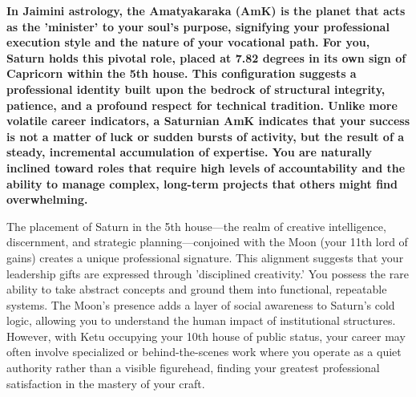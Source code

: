 
\label{topic24}

{\fontsize{9.5}{13.8}\selectfont\bfseries\color{DeepSlate} In Jaimini astrology, the Amatyakaraka (AmK) is the planet that acts as the 'minister' to your soul's purpose, signifying your professional execution style and the nature of your vocational path. For you, Saturn holds this pivotal role, placed at 7.82 degrees in its own sign of Capricorn within the 5th house. This configuration suggests a professional identity built upon the bedrock of structural integrity, patience, and a profound respect for technical tradition. Unlike more volatile career indicators, a Saturnian AmK indicates that your success is not a matter of luck or sudden bursts of activity, but the result of a steady, incremental accumulation of expertise. You are naturally inclined toward roles that require high levels of accountability and the ability to manage complex, long-term projects that others might find overwhelming.}\par\vspace{2mm}

{\fontsize{9}{13}\selectfont The placement of Saturn in the 5th house---the realm of creative intelligence, discernment, and strategic planning---conjoined with the Moon (your 11th lord of gains) creates a unique professional signature. This alignment suggests that your leadership gifts are expressed through 'disciplined creativity.' You possess the rare ability to take abstract concepts and ground them into functional, repeatable systems. The Moon's presence adds a layer of social awareness to Saturn's cold logic, allowing you to understand the human impact of institutional structures. However, with Ketu occupying your 10th house of public status, your career may often involve specialized or behind-the-scenes work where you operate as a quiet authority rather than a visible figurehead, finding your greatest professional satisfaction in the mastery of your craft.}\par\vspace{1.8mm}

